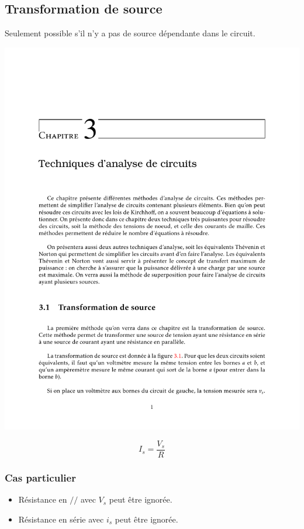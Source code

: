 \raggedright


\subsection{Transformation de source}
Seulement possible s'il n'y a pas de source dépendante dans le circuit.
\begin{multicols*}{2} 
\centering
\includegraphics[trim={1.75in 8.375in 1.75in 1in}, clip=true,page=2,height=.85in]{fig/equiv.pdf}

\begin{equation*}
    I_s = \frac{V_s}{R}
\end{equation*}
\end{multicols*}
\vspace{-1\baselineskip}

\subsubsection{Cas particulier}
\begin{itemize}[nosep]
    \item Résistance en $//$ avec $V_s$ peut être ignorée.
    \item Résistance en série avec $i_s$ peut être ignorée.
\end{itemize}


